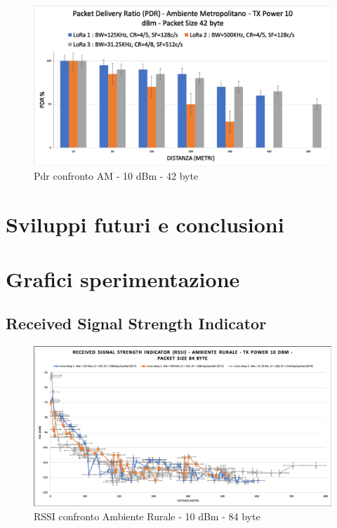 \documentclass[12pt,a4paper,openright,twoside]{report}
\begin{document}
\begin{figure}[h]                      
\begin{center} 
\includegraphics[width=\textwidth]{PDR_BAR_confronto_AM_10dBm-42byte.png}
\caption[Pdr confronto AM - 10 dBm - 42 byte]{Pdr confronto AM - 10 dBm - 42 byte}\label{fig:prima}
\end{center}
\end{figure}





\chapter{Sviluppi futuri e conclusioni}




\appendix
\chapter{Grafici sperimentazione}
\section{Received Signal Strength Indicator}
\begin{figure}[h]                      
\begin{center} 
\includegraphics[width=\textwidth]{RSSI_confronto_AR-10dBm-84byte.png}
\caption[RSSI confronto Ambiente Rurale - 10 dBm - 84 byte]{RSSI confronto Ambiente Rurale - 10 dBm - 84 byte}\label{fig:prima}
\end{center}
\end{figure}
\end{document}
